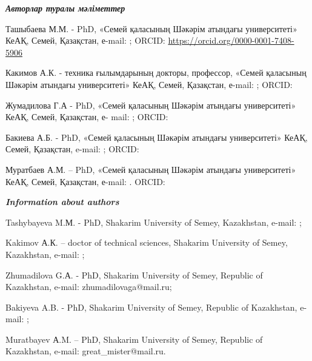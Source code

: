 \begin{authorinfo}
\emph{{\bfseries Авторлар туралы мәліметтер}}

Ташыбаева М.М. - PhD, «Семей қаласының Шәкәрім атындағы университеті»
КеАҚ, Семей, Қазақстан, е-mail:
\href{mailto:marzhan06081990@gmail.com}{};
ORCID: \url{https://orcid.org/0000-0001-7408-5906}

Какимов А.К. - техника ғылымдарының докторы, профессор, «Семей қаласының
Шәкәрім атындағы университеті» КеАҚ, Семей, Қазақстан, е-mail:
\href{mailto:bibi.53@mail.ru}{}; ORCID:
\href{https://orcid.org/0000-0002-9607-1684}{}

Жумадилова Г.А - PhD, «Семей қаласының Шәкәрім атындағы университеті»
КеАҚ, Семей, Қазақстан, е- mail:
\href{mailto:zhumadilovaga@mail.ru}{}; ORCID:
\href{https://orcid.org/0000-0003-0722-8860}{}

Бакиева А.Б. - PhD, «Семей қаласының Шәкәрім атындағы университеті»
КеАҚ, Семей, Қазақстан, e-mail:
\href{mailto:anara_bakieva@mail.ru}{}; ORCID:
\href{https://orcid.org/0009-0003-5904-1253}{}

Муратбаев А.М. -- PhD, «Семей қаласының Шәкәрім атындағы университеті»
КеАҚ, Семей, Қазақстан, е-mail:
\href{mailto:great_mister@mail.ru}{}. ORCID:
\href{https://orcid.org/0000-0002-0830-5007}{}

\emph{{\bfseries Information about authors}}

Tashybayeva M.М. - PhD, Shakarim University of Semey, Kazakhstan,
e-mail:
\href{mailto:marzhan06081990@gmail.com}{};

Kakimov А.К. -- doctor of technical sciences, Shakarim University of
Semey, Kazakhstan, e-mail:
\href{mailto:bibi.53@mail.ru}{};

Zhumadilova G.А. - PhD, Shakarim University of Semey, Republic of
Kazakhstan, e-mail: zhumadilovaga@mail.ru;

Bakiyeva A.B. - PhD, Shakarim University of Semey, Republic of
Kazakhstan, e-mail:
\href{mailto:anara_bakieva@mail.ru}{};

Muratbayev А.M. -- PhD, Shakarim University of Semey, Republic of
Kazakhstan, e-mail: great\_mister@mail.ru.\
\end{authorinfo}
